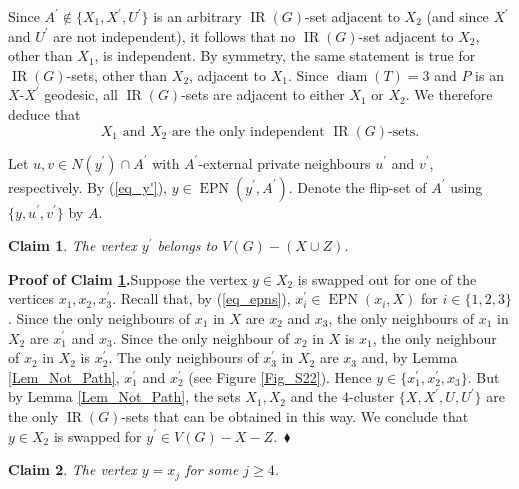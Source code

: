 \documentclass[12pt]{article}%
\newtheorem{claim}{Claim}
\begin{document}
Since $A^{\prime}\notin\{X_{1},X^{\prime},U^{\prime}\}$ is an arbitrary
$\operatorname{IR}(G)$-set adjacent to $X_{2}$ (and since $X^{\prime}$ and
$U^{\prime}$ are not independent), it follows that no $\operatorname{IR}%
(G)$-set adjacent to $X_{2}$, other than $X_{1}$, is independent. By symmetry,
the same statement is true for $\operatorname{IR}(G)$-sets, other than $X_{2}%
$, adjacent to $X_{1}$. Since $\operatorname{diam}(T)=3$ and $P$ is an
$X$-$X^{\prime}$ geodesic, all $\operatorname{IR}(G)$-sets are adjacent to
either $X_{1}$ or $X_{2}$. We therefore deduce that
\begin{equation}
X_{1}\text{\ and\ }X_{2}\text{\ are\ the\ only\ independent\ }%
\operatorname{IR}(G)\text{-sets.} \label{eq_indep}%
\end{equation}


Let $u,v\in N(y^{\prime})\cap A^{\prime}$ with $A^{\prime}$-external private
neighbours $u^{\prime}$ and $v^{\prime}$, respectively. By (\ref{eq_y'}),
$y\in\operatorname{EPN}(y^{\prime},A^{\prime})$. Denote the flip-set of
$A^{\prime}$ using $\{y,u^{\prime},v^{\prime}\}$ by $A$.

\begin{claim}
\label{Cl3}The vertex $y^{\prime}$ belongs to $V(G)-(X\cup Z)$\emph{.}
\end{claim}

\noindent\textbf{Proof of Claim \ref{Cl3}.\hspace{0.1in}}Suppose the vertex
$y\in X_{2}$ is swapped out for one of the vertices $x_{1},x_{2},x_{3}%
^{\prime}$. Recall that, by (\ref{eq_epns}), $x_{i}^{\prime}\in
\operatorname{EPN}(x_{i},X)$ for $i\in\{1,2,3\}$. Since the only neighbours of
$x_{1}$ in $X$ are $x_{2}$ and $x_{3}$, the only neighbours of $x_{1}$ in
$X_{2}$ are $x_{1}^{\prime}$ and $x_{3}$. Since the only neighbour of $x_{2}$
in $X$ is $x_{1}$, the only neighbour of $x_{2}$ in $X_{2}$ is $x_{2}^{\prime
}$. The only neighbours of $x_{3}^{\prime}$ in $X_{2}$ are $x_{3}$ and, by
Lemma \ref{Lem_Not_Path}, $x_{1}^{\prime}$ and $x_{2}^{\prime}$ (see Figure
\ref{Fig_S22}). Hence $y\in\{x_{1}^{\prime},x_{2}^{\prime},x_{3}\}$. But by
Lemma \ref{Lem_Not_Path}, the sets $X_{1},X_{2}$ and the $4$-cluster
$\{X,X^{\prime},U,U^{\prime}\}$ are the only $\operatorname{IR}(G)$-sets that
can be obtained in this way. We conclude that $y\in X_{2}$ is swapped for
$y^{\prime}\in V(G)-X-Z$.~$\blacklozenge$

\begin{claim}
\label{Cl4}The vertex $y=x_{j}$ for some $j\geq4$.
\end{claim}
\end{document}
